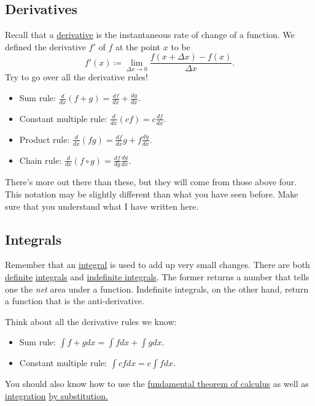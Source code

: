     \subsection{Derivatives}
    Recall that a \underline{derivative} is the instantaneous rate of change of a function. We defined the derivative $f'$ of $f$ at the point $x$ to be
    \[
    f'(x)\coloneqq\lim_{\Delta x \to 0} \frac{f(x+\Delta x)-f(x)}{\Delta x}.
    \]
    Try to go over all the derivative rules! 
    \begin{itemize}
        \item Sum rule: $\displaystyle{\frac{d}{dx}(f+g)=\frac{df}{dx}+\frac{dg}{dx}}$.
        \item Constant multiple rule: $\displaystyle{\frac{d}{dx}(cf)}=c\frac{df}{dx}$.
        \item Product rule: $\displaystyle{\frac{d}{dx}(fg)=\frac{df}{dx}g+f\frac{dg}{dx}}$.
        \item Chain rule: $\displaystyle{\frac{d}{dx}(f\circ g)=\frac{df}{dg}\frac{dg}{dx}}.$
    \end{itemize}
    There's more out there than these, but they will come from those above four.  This notation may be slightly different than what you have seen before. Make sure that you understand what I have written here.
    
    
    \subsection{Integrals}
    Remember that an \underline{integral} is used to add up very small changes.  There are both \underline{definite} \underline{integrals} and \underline{indefinite integrals}. The former returns a number that tells one the \emph{net} area under a function.  Indefinite integrals, on the other hand, return a function that is the anti-derivative. 
    
    Think about all the derivative rules we know:
    \begin{itemize}
        \item Sum rule: $\displaystyle{\int f + g dx=\int f dx + \int g dx}$.
        \item Constant multiple rule: $\displaystyle{\int cf dx = c \int f dx}$.
    \end{itemize}
    
    You should also know how to use the \underline{fundamental theorem of calculus} as well as \underline{integration} \underline{by substitution.}
    

